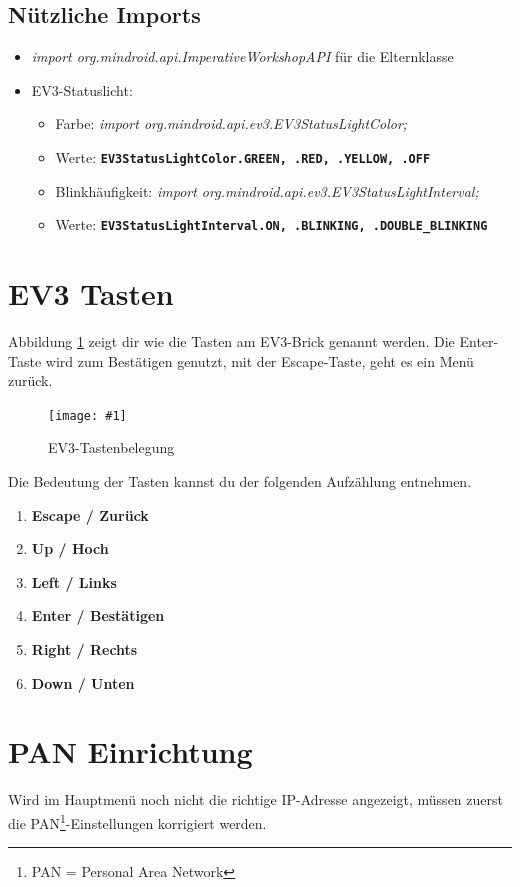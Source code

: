 \documentclass[
	12pt,
	colorbacktitle,
	accentcolor=tud1c,
	german
]{tuddesign/tudexercise}
\newcommand{\gcenter}[4]{
	\begin{figure}[h]
	\centering 
	\texttt{[image: \#1]}
	\caption{#2}
	\label{fig:#3}
	\end{figure}
}
\newcommand{\bfcode}[1]{\texttt{\textbf{#1}}}
\begin{document}
	\subsection{Nützliche Imports}
	\begin{itemize}
	\item \emph{import org.mindroid.api.ImperativeWorkshopAPI} für die Elternklasse
	\item EV3-Statuslicht:
	\begin{itemize}
	\item Farbe: \emph{import org.mindroid.api.ev3.EV3StatusLightColor;}
	\item Werte: \bfcode{EV3StatusLightColor.GREEN, .RED, .YELLOW, .OFF}
	\item Blinkhäufigkeit: \emph{import org.mindroid.api.ev3.EV3StatusLightInterval; }
	\item Werte: \bfcode{EV3StatusLightInterval.ON, .BLINKING, .DOUBLE\_BLINKING}
	\end{itemize}
	\end{itemize}
	
	\newpage

	\newpage

	\newpage

	\newpage
	
	\appendix
	\section{EV3 Tasten}
	Abbildung \ref{fig:buttons} zeigt dir wie die Tasten am EV3-Brick genannt werden. Die Enter-Taste wird zum Bestätigen genutzt, mit der Escape-Taste, geht es ein Menü zurück. 
		\gcenter{img/ev3_buttons.png}{EV3-Tastenbelegung\protect\footnotemark\ }{buttons}{.5\textwidth}
		
	Die Bedeutung der Tasten kannst du der folgenden Aufzählung entnehmen. 
	\begin{enumerate}
	\item \textbf{Escape / Zurück}
	\item \textbf{Up / Hoch}
	\item \textbf{Left / Links}
	\item \textbf{Enter / Bestätigen}
	\item \textbf{Right / Rechts}  
	\item \textbf{Down / Unten}  
	\end{enumerate}
	\newpage
	\section{PAN Einrichtung}
	\label{sec:pan}
			Wird im Hauptmenü noch nicht die richtige IP-Adresse angezeigt, müssen zuerst die PAN\footnote{PAN = Personal Area Network}-Einstellungen korrigiert werden.
		
\end{document}
